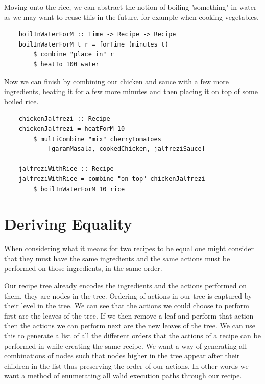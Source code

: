 \documentclass[11pt]{article}
\begin{document}
Moving onto the rice, we can abstract the notion of boiling "something" in water as we may
want to reuse this in the future, for example when cooking vegetables.

\begin{lstlisting}
    boilInWaterForM :: Time -> Recipe -> Recipe
    boilInWaterForM t r = forTime (minutes t) 
        $ combine "place in" r
        $ heatTo 100 water
\end{lstlisting}

Now we can finish by combining our chicken and sauce with a few more ingredients,
heating it for a few more minutes and then placing it on top of some boiled rice.

\begin{lstlisting}
    chickenJalfrezi :: Recipe
    chickenJalfrezi = heatForM 10
        $ multiCombine "mix" cherryTomatoes
            [garamMasala, cookedChicken, jalfreziSauce]

    jalfreziWithRice :: Recipe
    jalfreziWithRice = combine "on top" chickenJalfrezi
        $ boilInWaterForM 10 rice
\end{lstlisting}

\section{Deriving Equality}

When considering what it means for two recipes to be equal one
might consider that they must have the same ingredients
and the same actions must be performed on those ingredients,
in the same order.

\medbreak

Our recipe tree already encodes the ingredients and the actions
performed on them, they are nodes in the tree. Ordering of
actions in our tree is captured by their level in the tree.
We can see that the actions we could choose to perform first
are the leaves of the tree. If we then remove a leaf and perform
that action then the actions we can perform next are the new
leaves of the tree. We can use this to generate a list of all
the different orders that the actions of a recipe can be performed
in while creating the same recipe. We want a way of generating
all combinations of nodes such that nodes higher in the tree
appear after their children in the list thus preserving the
order of our actions. In other words we want a method of enumerating
all valid execution paths through our recipe.

\medbreak
\end{document}
